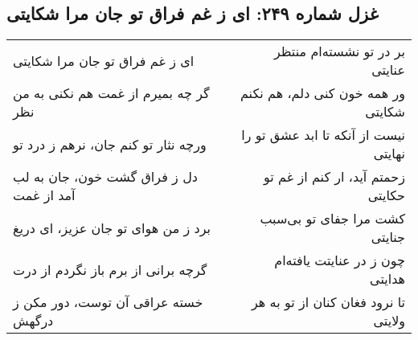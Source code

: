 \begin{center}
\section*{غزل شماره ۲۴۹: ای ز غم فراق تو جان مرا شکایتی}
\label{sec:249}
\begin{longtable}{l p{0.5cm} r}
ای ز غم فراق تو جان مرا شکایتی
&&
بر در تو نشسته‌ام منتظر عنایتی
\\
گر چه بمیرم از غمت هم نکنی به من نظر
&&
ور همه خون کنی دلم، هم نکنم شکایتی
\\
ورچه نثار تو کنم جان، نرهم ز درد تو
&&
نیست از آنکه تا ابد عشق تو را نهایتی
\\
دل ز فراق گشت خون، جان به لب آمد از غمت
&&
زحمتم آید، ار کنم از غم تو حکایتی
\\
برد ز من هوای تو جان عزیز، ای دریغ
&&
کشت مرا جفای تو بی‌سبب جنایتی
\\
گرچه برانی از برم باز نگردم از درت
&&
چون ز در عنایتت یافته‌ام هدایتی
\\
خسته عراقی آن توست، دور مکن ز درگهش
&&
تا نرود فغان کنان از تو به هر ولایتی
\\
\end{longtable}
\end{center}
